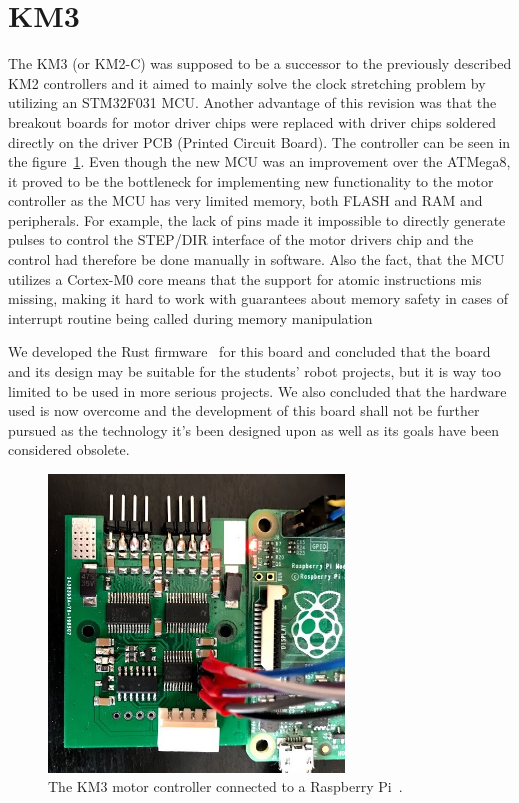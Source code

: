 \section{KM3}
\label{sec:km3}
The KM3 (or KM2-C) was supposed to be a successor to the previously described KM2 controllers and it aimed to mainly solve the clock stretching problem by utilizing an STM32F031 MCU.
Another advantage of this revision was that the breakout boards for motor driver chips were replaced with driver chips soldered directly on the driver PCB (Printed Circuit Board).
The controller can be seen in the figure~\ref{fig:km3}.
Even though the new MCU was an improvement over the ATMega8, it proved to be the bottleneck for implementing new functionality to the motor controller as the MCU has very limited memory, both FLASH and RAM and peripherals.
For example, the lack of pins made it impossible to directly generate pulses to control the STEP/DIR interface of the motor drivers chip and the control had therefore be done manually in software.
Also the fact, that the MCU utilizes a Cortex-M0 core means that the support for atomic instructions mis missing, making it hard to work with guarantees about memory safety in cases of interrupt routine being called during memory manipulation

We developed the Rust firmware~\cite{noauthor_robotics-butkm3-rs_2020} for this board and concluded that the board and its design may be suitable for the students' robot projects, but it is way too limited to be used in more serious projects.
We also concluded that the hardware used is now overcome and the development of this board shall not be further pursued as the technology it's been designed upon as well as its goals have been considered obsolete.

\begin{figure}[H]
    \centering
    \includegraphics[width=0.7\textwidth]{obrazky/km3}
    \caption{The KM3 motor controller connected to a Raspberry Pi~\cite{noauthor_km2renderpng_nodate}.}
    \label{fig:km3}
\end{figure}

